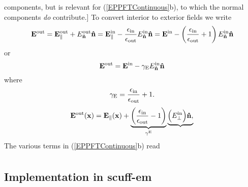 components, but is relevant for (\ref{EPPFTContinuous}b), to
which the normal components \textit{do} contribute.] To convert 
interior to exterior fields we write
$$
 \mathbf{E}^{\hbox{\scriptsize{out}}} 
= \mathbf{E}^{\hbox{\scriptsize{out}}}_\parallel + E^{\hbox{\scriptsize{out}}}_{\mathbf{\hat n}} \mathbf{\hat n}
= \mathbf{E}^{\hbox{\scriptsize{in}}}_\parallel - 
   \frac{\epsilon_{\hbox{\scriptsize{in}}}}{\epsilon_{\hbox{\scriptsize{out}}}}
   E^{\hbox{\scriptsize{in}}}_{\mathbf{\hat n}}\mathbf{\hat n}
\\
= \mathbf{E}^{\hbox{\scriptsize{in}}} - 
   \left( \frac{\epsilon_{\hbox{\scriptsize{in}}}}{\epsilon_{\hbox{\scriptsize{out}}}} + 1 \right)
   E^{\hbox{\scriptsize{in}}}_{\mathbf{\hat n}}\mathbf{\hat n}
$$
or 
$$ \mathbf{E}^{\hbox{\scriptsize{out}}} = \mathbf{E}^{\hbox{\scriptsize{in}}} - \gamma_{\hbox{\scriptsize{E}}} E^{\hbox{\scriptsize{in}}}_{\mathbf{\hat n}} 
   \mathbf{\hat n}
$$
where
$$ \gamma_{\hbox{\scriptsize{E}}}=\frac{\epsilon_{\hbox{\scriptsize{in}}}}{\epsilon_{\hbox{\scriptsize{out}}}}+1.$$
\begin{align*}
 \mathbf{E}^{\hbox{\scriptsize{out}}}(\mathbf{x})
&= \mathbf{E}_{\parallel}(\mathbf{x}) +
       \underbrace{
       \left(\frac{\epsilon_{\hbox{\scriptsize{in}}}}{\epsilon_{\hbox{\scriptsize{out}}}}-1\right)
                  }_{\gamma^{\hbox{\tiny{E}}}}
       \underbrace{
       \Big(E^{\hbox{\scriptsize{in}}}_\perp \Big)\mathbf{\hat n},
                  }
\\
\end{align*}
The various terms in (\ref{EPPFTContinuous}b) read
\begin{align*}
\end{align*}

\subsection*{Implementation in {\sc scuff-em}}

